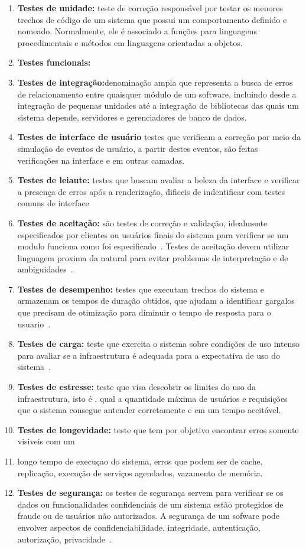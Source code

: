 \begin{enumerate}

\item \textbf{Testes de unidade:} teste de correção responsável por testar os 
menores trechos de código de um sistema que possui um comportamento definido e 
nomeado.
%
Normalmente, ele é associado a funções para linguagens procedimentais e métodos em 
linguagens orientadas a objetos.
\item \textbf{Testes funcionais:}
\item \textbf{Testes de integração:}denominação ampla que representa a busca de 
erros de relacionamento entre quaisquer módulo de um software, incluindo desde 
a integração de pequenas unidades até a integração de bibliotecas das quais um 
sistema depende, servidores e gerenciadores de banco de dados.
\item \textbf{Testes de interface de usuário} testes que verificam a correção 
por meio da simulação de eventos de usuário, a partir destes eventos, são feitas 
verificações na interface e em outras camadas.
\item \textbf{Testes de leiaute:} testes que buscam avaliar a beleza da interface 
e verificar a presença de erros após a renderização, dificeis de indentificar 
com testes comuns de interface
\item \textbf{Testes de aceitação:} são testes de correção e validação, idealmente 
especificados por clientes ou usuários finais do sistema para verificar se um 
modulo funciona como foi especificado~\cite{martin2005}.
%
Testes de aceitação devem utilizar linguagem proxima da natural para evitar 
problemas de interpretação e de ambiguidades~\cite{cunningham2005}.
\item \textbf{Testes de desempenho:} testes que executam trechos do sistema e 
armazenam os tempos de duração obtidos, que ajudam a identificar gargalos que 
precisam de otimização para diminuir o tempo de resposta  para o usuario~\cite{liu2009}.
\item \textbf{Testes de carga:}  teste que exercita o sistema sobre condições de uso 
intenso para avaliar se a infraestrutura é adequada para a expectativa de uso do 
sistema~\cite{avritze1994}.
\item \textbf{Testes de estresse:} teste que visa descobrir os limites do uso da 
infraestrutura, isto é , qual a quantidade máxima de usuários e requisições que o 
sistema consegue antender corretamente e em um tempo aceitável.
\item \textbf{Testes de longevidade:} teste que tem por objetivo encontrar erros 
somente visiveis com um
\item longo tempo de execuçao do sistema, erros que podem ser de cache, replicação, 
execução de serviços agendados, vazamento de memória.
\item \textbf{Testes de segurança:} os testes de segurança servem para verificar se 
os dados ou funcionalidades confidenciais de um sistema  estão protegidos de fraude 
ou de usuários não autorizados. A segurança de um sofware pode envolver aspectos de 
confidenciabilidade, integridade, autenticação, autorização, privacidade~\cite{whittaker2006}.

\end{enumerate}


